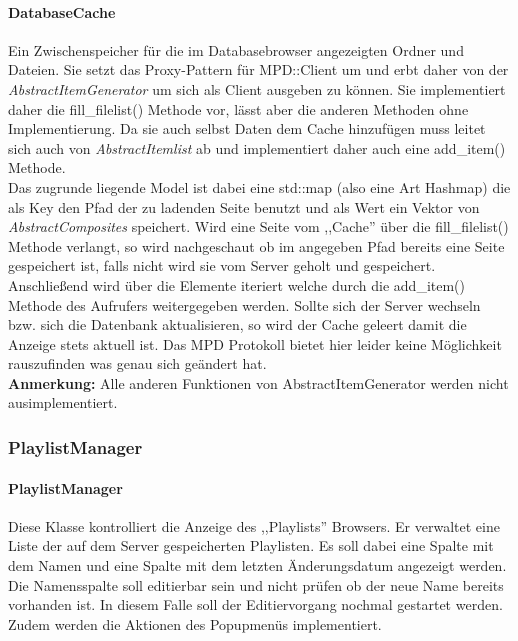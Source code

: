 \paragraph{DatabaseCache}
Ein Zwischenspeicher für die im Databasebrowser angezeigten Ordner und Dateien. 
Sie setzt das Proxy-Pattern für MPD::Client um und erbt daher von der \emph{AbstractItemGenerator} um sich als Client ausgeben zu können.
Sie implementiert daher die fill\_filelist() Methode vor, lässt aber die anderen Methoden ohne Implementierung.
Da sie auch selbst Daten dem Cache hinzufügen muss leitet sich auch von \emph{AbstractItemlist} ab und implementiert daher auch eine add\_item() Methode. 
\\
Das zugrunde liegende Model ist dabei eine std::map (also eine Art Hashmap) die als Key den Pfad der zu ladenden Seite benutzt
und als Wert ein Vektor von \emph{AbstractComposites} speichert. Wird eine Seite vom ,,Cache'' über die fill\_filelist() Methode verlangt,
so wird nachgeschaut ob im angegeben Pfad bereits eine Seite gespeichert ist, falls nicht wird sie vom Server geholt und gespeichert. 
Anschließend wird über die Elemente iteriert welche durch die add\_item() Methode des Aufrufers weitergegeben werden. 
Sollte sich der Server wechseln bzw. sich die Datenbank aktualisieren, so wird der Cache geleert damit die Anzeige stets aktuell ist. Das MPD Protokoll bietet hier leider keine Möglichkeit rauszufinden was genau sich geändert hat.
\\
\textbf{Anmerkung:} Alle anderen Funktionen von AbstractItemGenerator werden nicht ausimplementiert.

\subsubsection{PlaylistManager}
\paragraph{PlaylistManager}
Diese Klasse kontrolliert die Anzeige des ,,Playlists'' Browsers. Er verwaltet eine Liste der auf dem Server gespeicherten Playlisten. Es soll dabei eine Spalte mit dem Namen und eine Spalte mit dem letzten Änderungsdatum angezeigt werden.
Die Namensspalte soll editierbar sein und nicht prüfen ob der neue Name bereits vorhanden ist. In diesem Falle soll der Editiervorgang nochmal gestartet werden.
Zudem werden die Aktionen des Popupmenüs implementiert.

